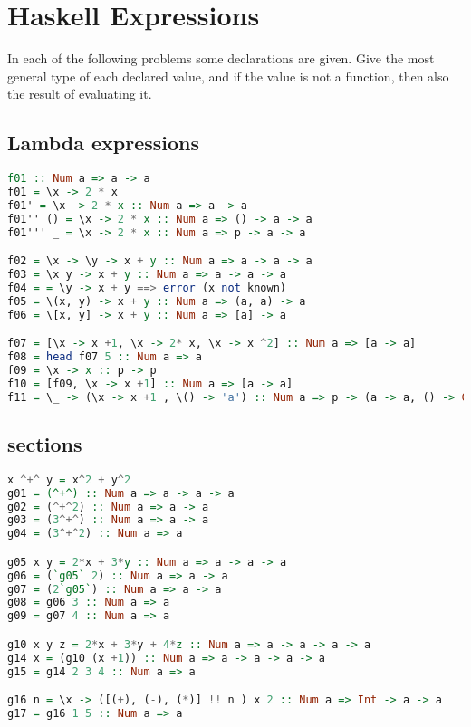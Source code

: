 \hypertarget{haskell-expressions}{%
\section{Haskell Expressions}\label{haskell-expressions}}

In each of the following problems some declarations are given. Give the
most general type of each declared value, and if the value is not a
function, then also the result of evaluating it.

\hypertarget{lambda-expressions}{%
\subsection{Lambda expressions}\label{lambda-expressions}}

\begin{lstlisting}[language=Haskell]
f01 :: Num a => a -> a
f01 = \x -> 2 * x
f01' = \x -> 2 * x :: Num a => a -> a
f01'' () = \x -> 2 * x :: Num a => () -> a -> a
f01''' _ = \x -> 2 * x :: Num a => p -> a -> a

f02 = \x -> \y -> x + y :: Num a => a -> a -> a
f03 = \x y -> x + y :: Num a => a -> a -> a
f04 = = \y -> x + y ==> error (x not known)
f05 = \(x, y) -> x + y :: Num a => (a, a) -> a
f06 = \[x, y] -> x + y :: Num a => [a] -> a

f07 = [\x -> x +1, \x -> 2* x, \x -> x ^2] :: Num a => [a -> a]
f08 = head f07 5 :: Num a => a
f09 = \x -> x :: p -> p
f10 = [f09, \x -> x +1] :: Num a => [a -> a]
f11 = \_ -> (\x -> x +1 , \() -> 'a') :: Num a => p -> (a -> a, () -> Char)
\end{lstlisting}

\hypertarget{sections}{%
\subsection{sections}\label{sections}}

\begin{lstlisting}[language=Haskell]
x ^+^ y = x^2 + y^2
g01 = (^+^) :: Num a => a -> a -> a
g02 = (^+^2) :: Num a => a -> a
g03 = (3^+^) :: Num a => a -> a
g04 = (3^+^2) :: Num a => a

g05 x y = 2*x + 3*y :: Num a => a -> a -> a
g06 = (`g05` 2) :: Num a => a -> a
g07 = (2`g05`) :: Num a => a -> a
g08 = g06 3 :: Num a => a
g09 = g07 4 :: Num a => a

g10 x y z = 2*x + 3*y + 4*z :: Num a => a -> a -> a -> a
g14 x = (g10 (x +1)) :: Num a => a -> a -> a -> a
g15 = g14 2 3 4 :: Num a => a

g16 n = \x -> ([(+), (-), (*)] !! n ) x 2 :: Num a => Int -> a -> a
g17 = g16 1 5 :: Num a => a
\end{lstlisting}

